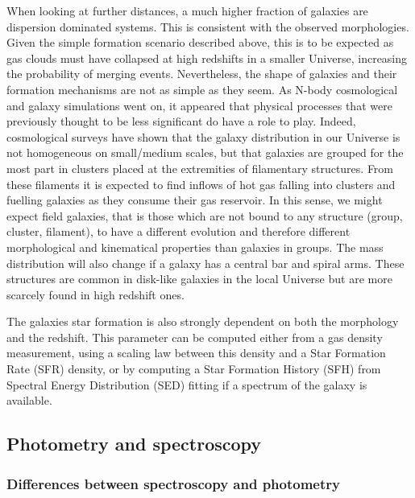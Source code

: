 When looking at further distances, a much higher fraction of galaxies are dispersion dominated systems. This is consistent with the observed morphologies. Given the simple formation scenario described above, this is to be expected as gas clouds must have collapsed at high redshifts in a smaller Universe, increasing the probability of merging events. Nevertheless, the shape of galaxies and their formation mechanisms are not as simple as they seem. As N-body cosmological and galaxy simulations went on, it appeared that physical processes that were previously thought to be less significant do have a role to play. Indeed, cosmological surveys have shown that the galaxy distribution in our Universe is not homogeneous on small/medium scales, but that galaxies are grouped for the most part in clusters placed at the extremities of filamentary structures. From these filaments it is expected to find inflows of hot gas falling into clusters and fuelling galaxies as they consume their gas reservoir. In this sense, we might expect field galaxies, that is those which are not bound to any structure (group, cluster, filament), to have a different evolution and therefore different morphological and kinematical properties than galaxies in groups. The mass distribution will also change if a galaxy has a central bar and spiral arms. These structures are common in disk-like galaxies in the local Universe but are more scarcely found in high redshift ones. 

The galaxies star formation is also strongly dependent on both the morphology and the redshift. This parameter can be computed either from a gas density measurement, using a scaling law between this density and a Star Formation Rate (SFR) density, or by computing a Star Formation History (SFH) from Spectral Energy Distribution (SED) fitting if a spectrum of the galaxy is available.


\subsection{Photometry and spectroscopy}
\label{subsec:diffPhotSpec}

\subsubsection{Differences between spectroscopy and photometry}
\label{subsubsec:photo_data}

